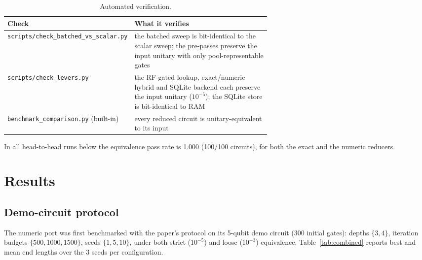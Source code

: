 \documentclass[11pt,a4paper]{article}
\begin{document}
\begin{table}[H]
\centering
\caption{Automated verification.}
\label{tab:verify}
\begin{tabular}{lp{0.62\linewidth}}
\toprule
Check & What it verifies \\
\midrule
\texttt{scripts/check\_batched\_vs\_scalar.py} & the batched sweep is bit-identical to the scalar sweep; the pre-passes preserve the input unitary with only pool-representable gates \\
\texttt{scripts/check\_levers.py} & the RF-gated lookup, exact/numeric hybrid and SQLite backend each preserve the input unitary ($10^{-5}$); the SQLite store is bit-identical to RAM \\
\texttt{benchmark\_comparison.py} (built-in) & every reduced circuit is unitary-equivalent to its input \\
\bottomrule
\end{tabular}
\end{table}

In all head-to-head runs below the equivalence pass rate is 1.000 (100/100
circuits), for both the exact and the numeric reducers.

\section{Results}
\label{sec:results}

\subsection{Demo-circuit protocol}
\label{sec:protocol}
The numeric port was first benchmarked with the paper's protocol on its 5-qubit
demo circuit (300 initial gates): depths $\{3,4\}$, iteration budgets
$\{500,1000,1500\}$, seeds $\{1,5,10\}$, under both strict ($10^{-5}$) and
loose ($10^{-3}$) equivalence. Table~\ref{tab:combined} reports best and mean
end lengths over the 3 seeds per configuration.
\end{document}

